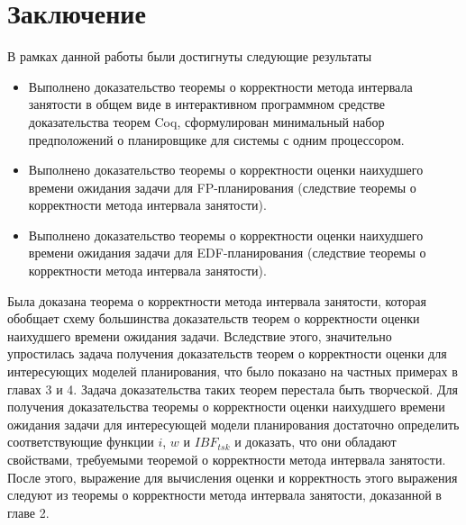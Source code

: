 \section*{Заключение}
В рамках данной работы были достигнуты следующие результаты
\begin{itemize}
    \item Выполнено доказательство теоремы о корректности метода интервала занятости в общем виде в интерактивном программном средстве доказательства теорем Coq, сформулирован минимальный набор предположений о планировщике для системы с одним процессором.
    \item Выполнено доказательство теоремы о корректности оценки наихудшего времени ожидания задачи для FP-планирования (следствие теоремы о корректности метода интервала занятости).
    \item Выполнено доказательство теоремы о корректности оценки наихудшего времени ожидания задачи для EDF-планирования (следствие теоремы о корректности метода интервала занятости).
\end{itemize}

Была доказана теорема о корректности метода интервала занятости, которая обобщает
  схему большинства доказательств теорем о корректности оценки наихудшего времени ожидания задачи.
  Вследствие этого, значительно упростилась задача получения доказательств теорем
  о корректности оценки для интересующих моделей планирования, что было
  показано на частных примерах в главах 3 и 4. Задача доказательства таких теорем перестала
  быть творческой. Для получения доказательства теоремы о корректности оценки
  наихудшего времени ожидания задачи для интересующей модели
  планирования достаточно определить соответствующие функции $i$, $w$ и $IBF_{tsk}$
  и доказать, что они обладают свойствами, требуемыми теоремой о корректности метода интервала занятости.
  После этого, выражение для
  вычисления оценки и корректность этого выражения следуют из теоремы о корректности
  метода интервала занятости, доказанной в главе 2.
